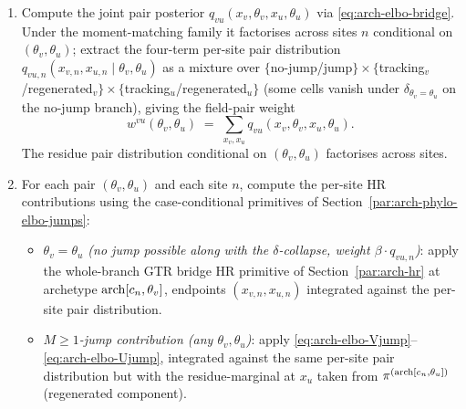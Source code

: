 \begin{enumerate}
\item Compute the joint pair posterior $q_{vu}(x_v, \theta_v, x_u,
    \theta_u)$ via \eqref{eq:arch-elbo-bridge}. Under the moment-matching
    family it factorises across sites $n$ conditional on $(\theta_v,
    \theta_u)$; extract the four-term per-site pair distribution
    $q_{vu, n}(x_{v, n}, x_{u, n} \mid \theta_v, \theta_u)$ as a
    mixture over $\{$no-jump/jump$\} \times \{$tracking$_v$/regenerated$_v\}
    \times \{$tracking$_u$/regenerated$_u\}$ (some cells vanish under
    $\delta_{\theta_v = \theta_u}$ on the no-jump branch), giving the
    field-pair weight
    \begin{equation}
      w^{vu}(\theta_v, \theta_u)
        \;=\;
        \sum_{x_v, x_u} q_{vu}(x_v, \theta_v, x_u, \theta_u).
    \label{eq:arch-elbo-wpair}
    \end{equation}
    The residue pair distribution conditional on $(\theta_v, \theta_u)$
    factorises across sites.

\item For each pair $(\theta_v, \theta_u)$ and each site $n$, compute
    the per-site HR contributions using the case-conditional primitives
    of Section~\ref{par:arch-phylo-elbo-jumps}:
    \begin{itemize}
    \item \emph{$\theta_v = \theta_u$ (no jump possible along with the
        $\delta$-collapse, weight $\beta \cdot q_{vu, n}$)}: apply the
        whole-branch GTR bridge HR primitive of Section~\ref{par:arch-hr}
        at archetype $\mathrm{arch}[c_n, \theta_v]$, endpoints
        $(x_{v, n}, x_{u, n})$ integrated against the per-site pair
        distribution.
    \item \emph{$M \geq 1$-jump contribution (any $\theta_v, \theta_u$)}:
        apply \eqref{eq:arch-elbo-Vjump}--\eqref{eq:arch-elbo-Ujump},
        integrated against the same per-site pair distribution but with
        the residue-marginal at $x_u$ taken from
        $\pi^{(\mathrm{arch}[c_n, \theta_u])}$ (regenerated component).
    \end{itemize}


\end{enumerate}
